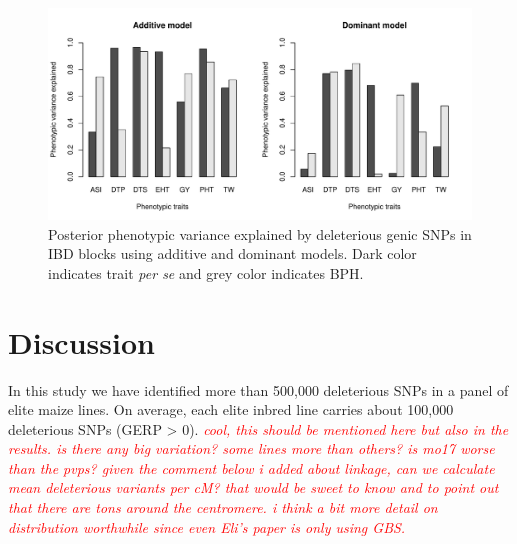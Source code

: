 \documentclass[9pt,twocolumn,twoside]{gsajnl}
\newcommand{\yang}[1]{\textcolor{cyan}{\emph{\bf  #1}} }
\newcommand{\jri}[1]{\textcolor{red}{ \emph{ #1}} }
\begin{document}
\begin{figure}[htbp]
\centering
\includegraphics[width=\linewidth]{Figure_h2.pdf}
\caption{Posterior phenotypic variance explained by deleterious genic SNPs in IBD blocks using additive and dominant models. Dark color indicates trait \emph{per se} and grey color indicates BPH. }  
\label{fig:h2}
\end{figure}


\section*{Discussion}


In this study we have identified more than 500,000 deleterious SNPs in a panel of elite maize lines.
On average, each elite inbred line carries about 100,000 deleterious SNPs (GERP > 0). \jri{cool, this should be mentioned here but also in the results. is there any big variation?  some lines more than others? is mo17 worse than the pvps? given the comment below i added about linkage, can we calculate mean deleterious variants per cM?  that would be sweet to know and to point out that there are tons around the centromere. i think a bit more detail on distribution worthwhile since even Eli's paper is only using GBS.}
\end{document}
